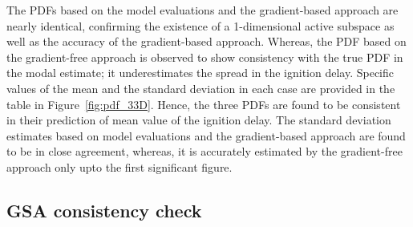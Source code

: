 %
%
%
The PDFs based on the model evaluations and the gradient-based approach are nearly identical, confirming
the existence of a 1-dimensional active subspace as well as the accuracy of the gradient-based approach. 
Whereas, the PDF based on the gradient-free approach is observed to show consistency with the true PDF in the modal
estimate; it underestimates the spread in the ignition delay. Specific values of the mean and the standard deviation
in each case are provided in the table in Figure~\ref{fig:pdf_33D}. Hence, the three PDFs are found to be
consistent in their prediction of mean value of the ignition delay.  The standard deviation estimates based on model
evaluations and the gradient-based approach are found to be in close agreement, whereas, it  is accurately estimated
by the gradient-free approach only upto the first significant figure. 

\subsection{GSA consistency check}

